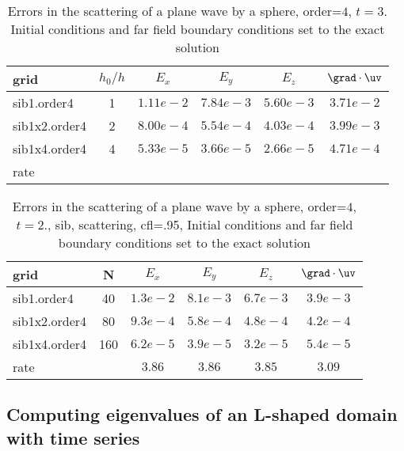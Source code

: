 \begin{table}[hbt]
\begin{center}
\begin{tabular}{|l|c|c|c|c|c|} \hline\hline 
grid           & $h_0/h$ &    $E_x$       &  $E_y$       & $E_z$        & $\grad\cdot\uv$\\ \hline 
sib1.order4    &   1     &  $1.11e-2$  & $7.84e-3$ & $5.60e-3$ & $3.71e-2$   \\ \hline
sib1x2.order4  &   2     &  $8.00e-4$  & $5.54e-4$ & $4.03e-4$ & $3.99e-3$   \\ \hline
sib1x4.order4  &   4     &  $5.33e-5$  & $3.66e-5$ & $2.66e-5$ & $4.71e-4$   \\ \hline
   rate        &         &  $       $  & $       $ & $       $ & $       $   \\ \hline
\end{tabular}
\caption{Errors in the scattering of a plane wave by a sphere, order=$4$, $t=3$. Initial conditions and
   far field boundary conditions set to the exact solution}\label{table:scatSphere}
\end{center}
\end{table}

\begin{table}[hbt]
\begin{center}
\begin{tabular}{|l|c|c|c|c|c|} \hline\hline 
grid  & N &  $E_x$ &  $E_y$ & $E_z$ & $\grad\cdot\uv$\\ \hline 
         sib1.order4 &    40 &$1.3 e-2$ &$8.1 e-3$ &$6.7 e-3$ &$3.9 e-3$  \\ \hline
       sib1x2.order4 &    80 &$9.3 e-4$ &$5.8 e-4$ &$4.8 e-4$ &$4.2 e-4$  \\ \hline
       sib1x4.order4 &   160 &$6.2 e-5$ &$3.9 e-5$ &$3.2 e-5$ &$5.4 e-5$  \\ \hline
    rate            &     &       $3.86$ &       $3.86$ &       $3.85$ &       $3.09$  \\ \hline\hline
\end{tabular}
\caption{Errors in the scattering of a plane wave by a sphere, order=$4$, $t=2.$, sib, scattering, cfl=.95,
   Initial conditions and far field boundary conditions set to the exact solution}\label{table:mx.sib}
\end{center}
\end{table}

\clearpage
\subsection{Computing eigenvalues of an L-shaped domain with time series}

